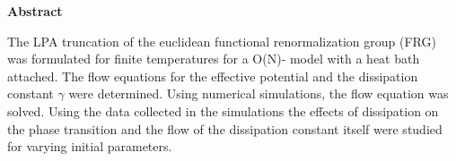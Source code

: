 	\vspace{5cm}
\begin{center}
	\large
    \textbf{Abstract}
\end{center}
\normalsize
The LPA truncation of the euclidean functional renormalization group (FRG) was formulated for finite temperatures for a O(N)- model with a heat bath attached. The flow equations for the effective potential and the dissipation constant $\gamma$ were determined. Using numerical simulations, the flow equation was solved. Using the data collected in the simulations the effects of dissipation on the phase transition and the flow of the dissipation constant itself were studied for varying initial parameters.


